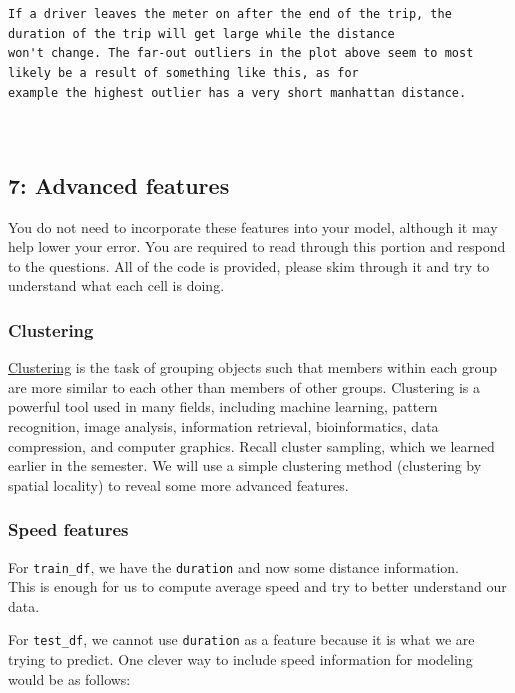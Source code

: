 \documentclass[11pt]{article}
\begin{document}
    \begin{Verbatim}[commandchars=\\\{\}]


If a driver leaves the meter on after the end of the trip, the duration of the trip will get large while the distance
won't change. The far-out outliers in the plot above seem to most likely be a result of something like this, as for
example the highest outlier has a very short manhattan distance.



    \end{Verbatim}

    \subsection{7: Advanced features}\label{advanced-features}

You do not need to incorporate these features into your model, although
it may help lower your error. You are required to read through this
portion and respond to the questions. All of the code is provided,
please skim through it and try to understand what each cell is doing.

\subsubsection{Clustering}\label{clustering}

\href{https://en.wikipedia.org/wiki/Cluster_analysis}{Clustering} is the
task of grouping objects such that members within each group are more
similar to each other than members of other groups. Clustering is a
powerful tool used in many fields, including machine learning, pattern
recognition, image analysis, information retrieval, bioinformatics, data
compression, and computer graphics. Recall cluster sampling, which we
learned earlier in the semester. We will use a simple clustering method
(clustering by spatial locality) to reveal some more advanced features.

\subsubsection{Speed features}\label{speed-features}

For \texttt{train\_df}, we have the \texttt{duration} and now some
distance information.\\
This is enough for us to compute average speed and try to better
understand our data.

For \texttt{test\_df}, we cannot use \texttt{duration} as a feature
because it is what we are trying to predict. One clever way to include
speed information for modeling would be as follows:
\end{document}
